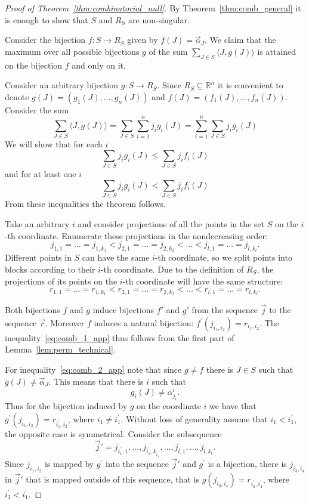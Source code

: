 \documentclass[11pt]{article}
\newcommand{\bb}[1]{\mathbb{#1}}
\begin{document}
\begin{proof}[Proof of Theorem~\ref{thm:combinatorial_null}]
By Theorem~\ref{thm:comb_general} it is enough to show that $S$ and $R_S$ are non-singular.

Consider the bijection $f \colon S \to R_S$ given by $f(J) = \vec{\alpha}_{J}$. We claim that the maximum over all possible bijections $g$ of the sum $\sum_{J\in S} \langle J, g(J) \rangle$ is attained on the bijection $f$ and only on it.

Consider an arbitrary bijection $g \colon S \to R_S$.  Since $R_S \subseteq \bb{R}^n$ it is convenient to denote $g(J) = (g_1(J),\ldots,g_n(J))$ and $f(J) = (f_1(J),\ldots,f_n(J))$. Consider the sum 
$$
\sum_{J\in S} \langle J, g(J) \rangle = \sum_{J\in S} \sum_{i=1}^n j_i g_i(J) = \sum_{i=1}^n \sum_{J\in S} j_i g_i(J)
$$
We will show that for each $i$ 
\begin{equation} \label{eq:comb_1_app}
\sum_{J\in S} j_i g_i(J) \leq \sum_{J\in S} j_i f_i(J)
\end{equation}
and for at least one $i$
\begin{equation} \label{eq:comb_2_app}
\sum_{J\in S} j_i g_i(J) < \sum_{J\in S} j_i f_i(J)
\end{equation}
From these inequalities the theorem follows.

Take an arbitrary $i$ and consider projections of all the points in the set $S$ on the $i$-th coordinate. Enumerate these projections in the nondecreasing order:
$$
j_{1,1}=\ldots=j_{1,k_1} < j_{2,1}=\ldots=j_{2,k_2}<\ldots<j_{l,1}=\ldots=j_{l,k_l}.
$$
Different points in $S$ can have the same $i$-th coordinate, so we split points into blocks according to their $i$-th coordinate.
Due to the definition of $R_S$, the projections of its points on the $i$-th coordinate will have the same structure:
$$
r_{1,1}=\ldots=r_{1,k_1} < r_{2,1}=\ldots=r_{2,k_2}<\ldots<r_{l,1}=\ldots=r_{l,k_l}.
$$

Both bijections $f$ and $g$ induce bijections $f'$ and $g'$ from the sequence $\vec{j}$ to the sequence $\vec{r}$. Moreover $f$ induces a natural bijection: $f^\prime(j_{i_1,i_2})=r_{i_1,i_2}$. The inequality~\eqref{eq:comb_1_app} thus follows from the first part of Lemma~\ref{lem:perm_technical}.

For inequality~\eqref{eq:comb_2_app} note that since $g\neq f$ there is $J \in S $ such that $g(J) \neq \vec{\alpha}_{J}$. This means that there is $i$ such that 
$$
g_i(J) \neq \alpha^i_{j_i}.
$$ 
Thus for the bijection induced by $g$ on the coordinate $i$ we have that $g^{\prime}(j_{i_1,i_2}) = r_{i_1^\prime,i_2^\prime}$, where $i_1 \neq i_{1}^\prime$. Without loss of generality assume that $i_1 < i_{1}^\prime$, the opposite case is symmetrical. Consider the subsequence 
$$
\vec{j}'=j_{i_1^\prime,1}, \ldots, j_{i_1^\prime,k_{i_1^\prime}}, \ldots, j_{l,1}, \ldots, j_{l,k_l}.
$$
Since $j_{i_1,i_2}$ is mapped by $g^\prime$ into the sequence $\vec{j}'$ and $g^\prime$ is a bijection, there is $j_{i_3,i_4}$ in $\vec{j}'$ that is mapped outside of this sequence, that is $g(j_{i_3,i_4}) = r_{i_{3}^\prime,i_4^\prime}$, where $i_{3}^\prime < i_1^\prime$.


\end{proof}
\end{document}
